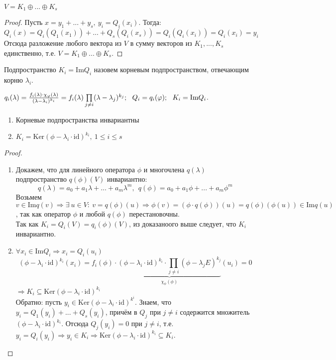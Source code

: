     \begin{subtheorem}
        $V = K_1 \oplus ... \oplus K_s$
    \end{subtheorem}
    \begin{proof}
        Пусть $x = y_1 + ... + y_s, \ y_i = Q_i(x_i)$. Тогда:
        $$Q_i(x) = Q_i(Q_1(x_1)) + ... + Q_s(Q_i(x_s)) = Q_i(Q_i(x_i)) = Q_i(x_i) = y_i$$
        Отсюда разложение любого вектора из $V$ в сумму векторов из $K_1,...,K_s$ единственно, т.е. $V = K_1 \oplus ... \oplus K_s$.
    \end{proof}
    \begin{definition}
        Подпространство $K_i = \text{Im} Q_i$ назовем корневым подпространством, отвечающим корню $\lambda_i$.
    \end{definition}
    \begin{remark}
        $q_i(\lambda) = \frac{f_i(\lambda)\cdot \chi_\phi(\lambda)}{(\lambda-\lambda_i)^{k_i}} = f_i(\lambda)\prod\limits_{j \neq i}(\lambda-\lambda_j)^{k_j}; \ \ Q_i = q_i(\phi); \ \ K_i = \textup{Im}Q_i$.
    \end{remark} 
    \begin{subtheorem}\tab
        \begin{enumerate}
            \item Корневые подпространства инвариантны
            \item $K_i = \text{Ker} (\phi - \lambda_i\cdot \text{id})^{k_i}, \ 1\leq i \leq s$ 
        \end{enumerate}
    \end{subtheorem}
    \begin{proof}\tab 
        \begin{enumerate}
            \item Докажем, что для линейного оператора $\phi$ и многочлена $q(\lambda)$ подпространство $q(\phi)(V)$ инвариантно:
            $$q(\lambda) = a_0+ a_1 \lambda + ... + a_m \lambda^m, \ \ q(\phi) = a_0+ a_1 \phi + ... + a_m \phi^m$$
            Возьмем $v \in \text{Im}q(v) \Longrightarrow \exists \ u \in V: \ v = q(\phi)(u) \Longrightarrow \phi(v) = (\phi \cdot q(\phi))(u) = q(\phi)(\phi(u)) \in \text{Im}q(u)$, так как оператор $\phi$ и любой $q(\phi)$ перестановочны.\\
            Так как $K_i = Q_i(V) = q_i(\phi)(V)$, из доказаноого выше следует, что $K_i$ инвариантно.
            \item $\forall x_i \in \text{Im}Q_i \Longrightarrow x_i = Q_i(u_i)$
            $$(\phi-\lambda_i \cdot \text{id})^{k_i}(x_i) = f_i(\phi) \cdot \underbrace{(\phi-\lambda_i \cdot \text{id})^{k_i} \cdot \prod\limits_{j \neq i}(\phi-\lambda_j E)^{k_j}}_{\chi_\phi(\phi)}(u_i) = 0$$
            $\Longrightarrow K_i \subseteq \text{Ker}(\phi-\lambda_i \cdot \text{id})^{k_i}$\\ 
            Обратно: пусть $y_i \in \text{Ker}(\phi-\lambda_i \cdot \text{id})^{k^i}$. Знаем, что $y_i = Q_1(y_i) + ... + Q_s(y_i)$, причём в $Q_j$ при $j \neq i$ содержится множитель $(\phi-\lambda_i \cdot \text{id})^{k_i}$. Отсюда $Q_j(y_i) = 0$ при $j \neq i$, т.е. $y_i = Q_i(y_i) \Rightarrow y_i \in K_i \Rightarrow \text{Ker}(\phi-\lambda_i \cdot \text{id})^{k_i} \subseteq K_i$.
        \end{enumerate}
    \end{proof} 
